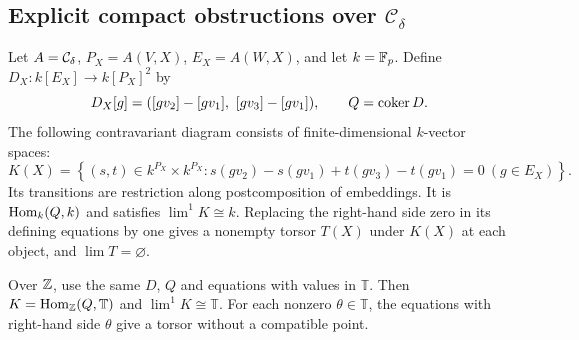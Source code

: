 

\subsection{Explicit compact obstructions over \texorpdfstring{$\mathcal C_\delta$}{C-delta}}

\begin{proposition}\label{C:explicit-torsor}
Let $A=\mathcal C_\delta$, $P_X=A(V,X)$, $E_X=A(W,X)$, and let $k=\mathbb F_p$. Define $D_X:k[E_X]\to k[P_X]^2$ by
\[
 D_X[g]=([gv_2]-[gv_1],\ [gv_3]-[gv_1]),\qquad Q=\coker D.
\]
The following contravariant diagram consists of finite-dimensional $k$-vector spaces:
\[
 K(X)=\left\{(s,t)\in k^{P_X}\times k^{P_X}:
 s(gv_2)-s(gv_1)+t(gv_3)-t(gv_1)=0\ (g\in E_X)\right\}.
\]
Its transitions are restriction along postcomposition of embeddings. It is $\operatorname{Hom}_k(Q,k)$ and satisfies $\lim^1K\cong k$. Replacing the right-hand side zero in its defining equations by one gives a nonempty torsor $T(X)$ under $K(X)$ at each object, and $\lim T=\varnothing$.

Over $\mathbb Z$, use the same $D$, $Q$ and equations with values in $\mathbb T$. Then $K=\operatorname{Hom}_{\mathbb Z}(Q,\mathbb T)$ and $\lim^1K\cong\mathbb T$. For each nonzero $\theta\in\mathbb T$, the equations with right-hand side $\theta$ give a torsor without a compatible point.
\end{proposition}
